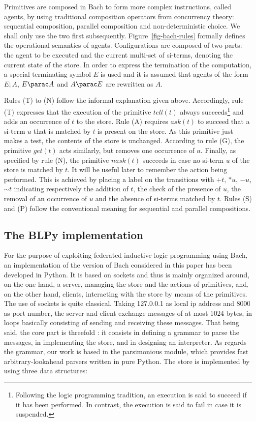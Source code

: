 Primitives are composed in Bach to form more complex instructions,
called agents, by using traditional composition operators from
concurrency theory: sequential composition, parallel composition and
non-deterministic choice. We shall only use the two first subsequently.
Figure~\ref{fig-bach-rules} formally defines the operational semantics
of agents.  Configurations are composed of two parts: the agent to be
executed and the current multi-set of si-terms, denoting the current
state of the store. In order to express the termination of the
computation, a special terminating symbol $E$ is used and it is assumed that agents of the form
$E ; A$, $E \parac A$ and $A \parac E$ are rewritten as $A$.

Rules (T) to (N) follow the informal explanation given
above. Accordingly, rule (T) expresses that the execution of the
primitive $tell(t)$ always succeeds\footnote{Following the logic programming tradition, an execution is said to succeed if it has been performed. In contrast, the execution is said to fail in case it is suspended.} 
and adds an occurrence of $t$ to
the store. Rule (A) requires $ask(t)$ to succeed that a si-term $u$
that is matched by $t$ is present on the store. As this primitive just makes a
test, the contents of the store is unchanged. According to rule (G),
the primitive $get(t)$ acts similarly, but removes one occurrence of
$u$. Finally, as specified by rule (N), the primitive $nask(t)$
succeeds in case no si-term $u$ of the store is matched by $t$. It will be
useful later to remember the action being performed. This is achieved by placing a label on the transitions with $+t$, $*u$, $-u$, $\sim t$ indicating respectively the addition of $t$, the check of the presence of $u$, the removal of an occurrence of $u$ and the absence of si-terms matched by $t$.
Rules (S) and
(P) follow the conventional meaning for sequential and parallel
compositions.


\subsection{The BLPy implementation}

For the purpose of exploiting federated inductive logic programming
using Bach, an implementation of the version of Bach considered in this paper  has been developed in Python. It is based on sockets and 
thus is mainly organized around, on the one hand, 
a server, managing the store and the actions of primitives, and, on the other hand,
clients, interacting with the store by means of the primitives. The
use of sockets is quite classical. Taking 127.0.0.1 as local ip address
and 8000 as port number, the server and client exchange messages of at
most 1024 bytes, in loops basically consisting of sending and receiving
these messages. That being said, the core part is threefold : it
consists in defining a grammar to parse the messages, in implementing
the store, and in designing an interpreter. As regards the grammar,
our work is based in the parsimonious module, which provides fast
arbitrary-lookahead parsers written in pure Python. The store is
implemented by using three data structures:

